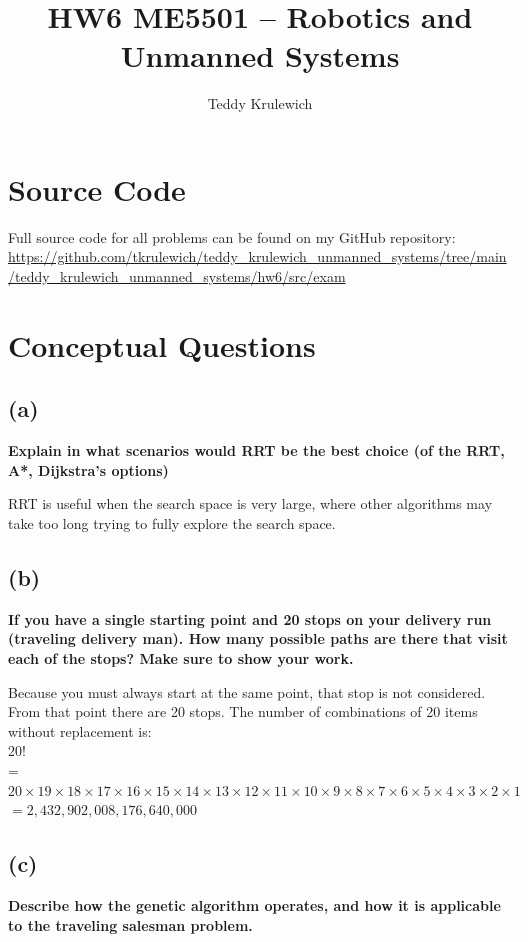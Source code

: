\documentclass{article}
\author{Teddy Krulewich}
\title{\vspace{-4em}HW6 ME5501 – Robotics and Unmanned Systems}
\begin{document}
\maketitle

\section*{Source Code}

Full source code for all problems can be found on my GitHub repository:
\url{https://github.com/tkrulewich/teddy_krulewich_unmanned_systems/tree/main/teddy_krulewich_unmanned_systems/hw6/src/exam}


\section{Conceptual Questions}

\subsection*{\textbf{(a)}}

\textbf{Explain in what scenarios would RRT be the best choice (of the RRT, A*, Dijkstra’s
options)}

\bigskip
RRT is useful when the search space is very large, where other algorithms may take too long trying to fully explore the search space.


\subsection*{\textbf{(b)}}
\textbf{If you have a single starting point and 20 stops on your delivery run (traveling delivery
man). How many possible paths are there that visit each of the stops? Make sure to show
your work.}

\bigskip
Because you must always start at the same point, that stop is not considered. From that point there are 20 stops. The number of combinations of 20 items without replacement is: \\

\noindent $20!$ \\ = $20 \times 19 \times 18 \times 17 \times 16 \times 15 \times 14 \times 13 \times 12 \times 11 \times 10 \times 9 \times 8 \times 7 \times 6 \times 5 \times 4 \times 3 \times 2 \times 1 $
$= 2,432,902,008,176,640,000$

\subsection*{\textbf{(c)}}
\textbf{Describe how the genetic algorithm operates, and how it is applicable to the traveling salesman problem.}
\end{document}

